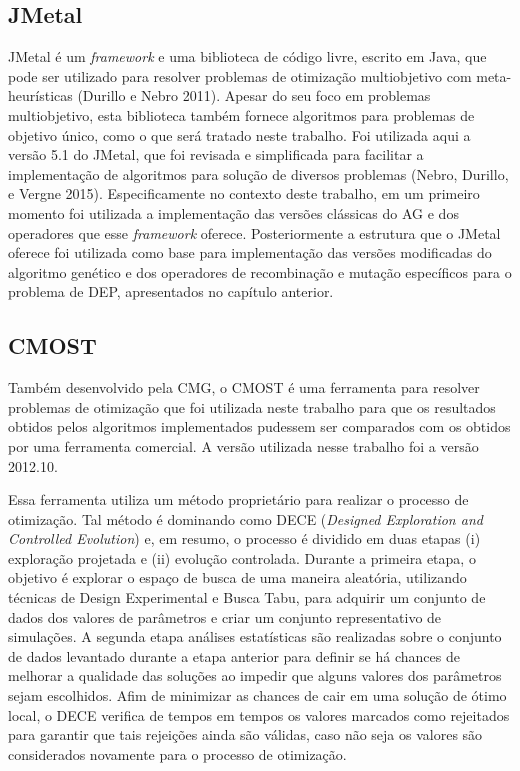 \subsection{JMetal}

JMetal é um \textit{framework} e uma biblioteca de código livre, escrito em Java, que pode ser utilizado para resolver problemas de otimização multiobjetivo com meta-heurísticas (Durillo e Nebro 2011). Apesar do seu foco em problemas multiobjetivo, esta biblioteca também fornece algoritmos para problemas de objetivo único, como o que será tratado neste trabalho. Foi utilizada aqui a versão 5.1 do JMetal, que foi revisada e simplificada para facilitar a implementação de algoritmos para solução de diversos problemas (Nebro, Durillo, e Vergne 2015). Especificamente no contexto deste trabalho, em um primeiro momento foi utilizada a implementação das versões clássicas do AG e dos operadores que esse \textit{framework} oferece. Posteriormente a estrutura que o JMetal oferece foi utilizada como base para implementação das versões modificadas do algoritmo genético e dos operadores de recombinação e mutação específicos para o problema de DEP, apresentados no capítulo anterior. 

\subsection{CMOST}

Também desenvolvido pela CMG, o CMOST é uma ferramenta para resolver problemas de otimização que foi utilizada neste trabalho para que os resultados obtidos pelos algoritmos implementados pudessem ser comparados com os obtidos por uma ferramenta comercial. A versão utilizada nesse trabalho foi a versão 2012.10.

Essa ferramenta utiliza um método proprietário para realizar o processo de otimização. Tal método é dominando como DECE (\textit{Designed Exploration and Controlled Evolution}) e, em resumo, o processo é dividido em duas etapas (i) exploração projetada e (ii) evolução controlada. Durante a primeira etapa, o objetivo é explorar o espaço de busca de uma maneira aleatória, utilizando técnicas de Design Experimental e Busca Tabu, para adquirir um conjunto de dados dos valores de parâmetros e criar um conjunto representativo de simulações. A segunda etapa análises estatísticas são realizadas sobre o conjunto de dados levantado durante a etapa anterior para definir se há chances de melhorar a qualidade das soluções ao impedir que alguns valores dos parâmetros sejam escolhidos. Afim de minimizar as chances de cair em uma solução de ótimo local, o DECE verifica de tempos em tempos os valores marcados como rejeitados para garantir que tais rejeições ainda são válidas, caso não seja os valores são considerados novamente para o processo de otimização.

